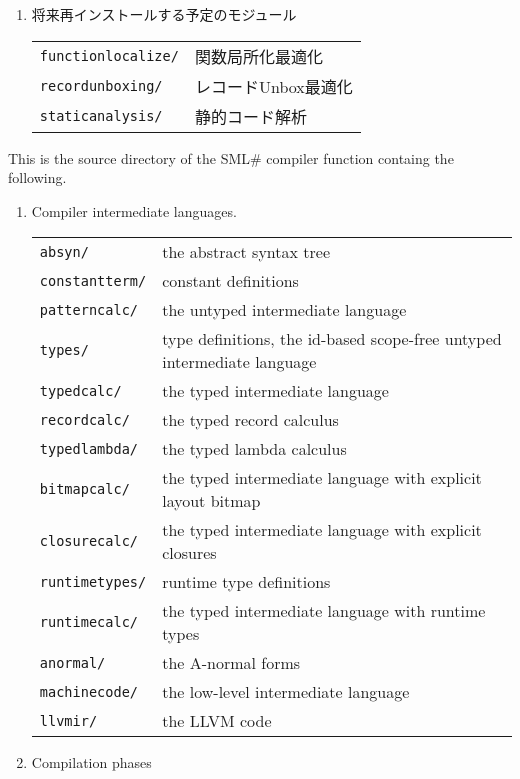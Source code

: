 \documentclass{jbook}
\newcommand{\smlsharp}{SML\#}
\newcommand{\code}[1]{\mbox{\large\tt #1}}
\begin{document}
\begin{enumerate}
\item 将来再インストールする予定のモジュール

\begin{tabular}{ll}
\code{functionlocalize/}& 関数局所化最適化
\\
\code{recordunboxing/}& レコードUnbox最適化
\\
\code{staticanalysis/}& 静的コード解析
\end{tabular}
\end{enumerate}
\else%

	This is the source directory of the \smlsharp{} compiler
function containg the following.

\begin{enumerate}
\item 
	Compiler intermediate languages.

\begin{tabular}{ll}
\code{absyn/}& the abstract syntax tree
\\
\code{constantterm/}& constant definitions
\\
\code{patterncalc/}& the untyped intermediate language
\\
\code{types/}& type definitions, the id-based scope-free untyped intermediate language
\\
\code{typedcalc/}& the typed intermediate language
\\
\code{recordcalc/}& the typed record calculus
\\
\code{typedlambda/}& the typed lambda calculus
\\
\code{bitmapcalc/}& the typed intermediate language with explicit layout bitmap
\\
\code{closurecalc/}& the typed intermediate language with explicit closures
\\
\code{runtimetypes/}& runtime type definitions
\\
\code{runtimecalc/}& the typed intermediate language with runtime types
\\
\code{anormal/}& the A-normal forms
\\
\code{machinecode/}& the low-level intermediate language
\\
\code{llvmir/}& the LLVM code
\end{tabular}

\item Compilation phases


\end{enumerate}
\end{document}
